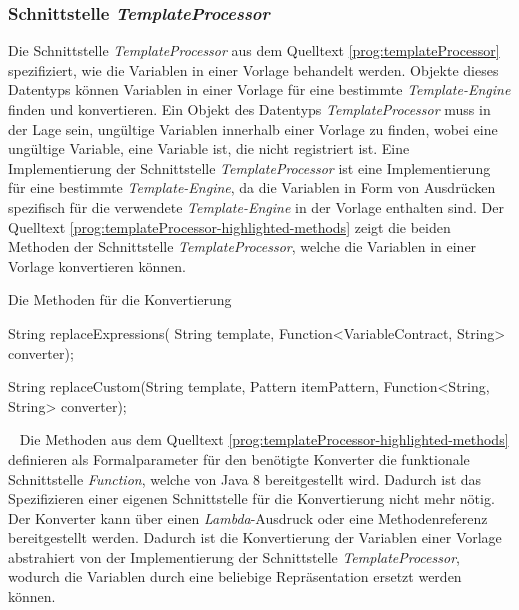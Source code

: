 \subsubsection{Schnittstelle \emph{TemplateProcessor}}
\label{sec:templateProcessor}
Die Schnittstelle \emph{TemplateProcessor} aus dem Quelltext  \ref{prog:templateProcessor} spezifiziert, wie die Variablen in einer Vorlage behandelt werden. Objekte dieses Datentyps können Variablen in einer Vorlage für eine bestimmte \emph{Template-Engine} finden und konvertieren. Ein Objekt des Datentyps \emph{TemplateProcessor} muss in der Lage sein, ungültige Variablen innerhalb einer Vorlage zu finden, wobei eine ungültige Variable, eine Variable ist, die nicht registriert ist. Eine Implementierung der Schnittstelle \emph{TemplateProcessor} ist eine Implementierung für eine bestimmte \emph{Template-Engine}, da die Variablen in Form von Ausdrücken spezifisch für die verwendete \emph{Template-Engine} in der Vorlage enthalten sind. 
\newline
\newline
Der Quelltext \ref{prog:templateProcessor-highlighted-methods} zeigt die beiden Methoden der Schnittstelle \emph{TemplateProcessor}, welche die Variablen in einer Vorlage konvertieren können.
\newpage

\begin{program}[h]
\caption{Die Methoden für die Konvertierung}
\label{prog:templateProcessor-highlighted-methods}
\begin{JavaCode}[numbers=none]
String replaceExpressions(
                  String template,
                  Function<VariableContract, String> converter);

String replaceCustom(String template,
                     Pattern itemPattern,
                     Function<String, String> converter);
\end{JavaCode}
\end{program}
\ \newline
Die Methoden aus dem Quelltext \ref{prog:templateProcessor-highlighted-methods} definieren als Formalparameter für den benötigte Konverter die funktionale Schnittstelle \emph{Function}, welche von Java 8 bereitgestellt wird. Dadurch ist das Spezifizieren einer eigenen Schnittstelle für die Konvertierung nicht mehr nötig. Der Konverter kann über einen \emph{Lambda}-Ausdruck oder eine  Methodenreferenz bereitgestellt werden. Dadurch ist die Konvertierung der Variablen einer Vorlage abstrahiert von der Implementierung der Schnittstelle \emph{TemplateProcessor}, wodurch die Variablen durch eine beliebige Repräsentation ersetzt werden können.

